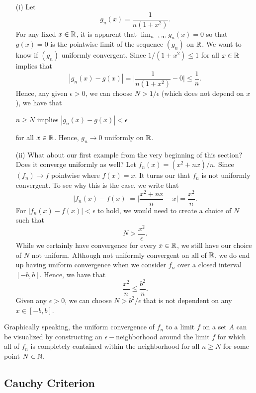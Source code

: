 \begin{enumerate}
    \item[(i)] Let 
        \[  g_n(x) = \frac{ 1 }{ n(1 + x^2 ) }.  \]
        For any fixed \( x \in \mathbb{R}  \), it is apparent that \( \lim_{ n \to \infty  } g_n(x) = 0  \) so that \( g(x) = 0   \) is the pointwise limit of the sequence \( (g_n)  \) on \( \mathbb{R}  \). We want to know if \( (g_n)  \) uniformly convergent. Since \( 1 / (1 + x^2 )  \leq 1  \) for all \( x \in \mathbb{R}  \) implies that 
        \[  | g_n(x) - g(x)  | = \Big| \frac{ 1 }{ n(1+x^2 )  } - 0  \Big| \leq \frac{ 1 }{ n }.  \]
Hence, any given \( \epsilon > 0  \), we can choose \( N > 1 / \epsilon  \) (which does not depend on \( x  \)), we have that
\begin{center}
    \( n \geq N  \) implies \( | g_n(x) - g(x)  | < \epsilon  \)
\end{center}
for all \( x \in \mathbb{R}  \). Hence, \( g_n \to 0 \) uniformly on \( \mathbb{R}  \).
\item[(ii)] What about our first example from the very beginning of this section? Does it converge uniformly as well?  Let \( f_n(x) = (x^2 + n x ) / n  \). Since \( (f_n) \to f  \) pointwise where \( f(x) =x  \). It turns our that \( f_n  \) is not uniformly convergent. To see why this is the case, we write that
    \[  | f_n(x) - f(x)  | = \Big| \frac{ x^2 + nx  }{ n  } - x  \Big| = \frac{ x^2  }{ n }. \]
    For \( | f_n(x) - f(x)  | < \epsilon  \) to hold, we would need to create a choice of \( N  \) such that 
    \[  N  > \frac{ x^2  }{ \epsilon  }. \]
    While we certainly have convergence for every \( x \in \mathbb{R}  \), we still have our choice of \( N  \) not uniform. Although not uniformly convergent on all of \( \mathbb{R}  \), we do end up having uniform convergence when we consider \( f_n  \) over a closed interval \( [-b,b] \). Hence, we have that 
    \[  \frac{ x^2  }{ n }  \leq \frac{ b^2  }{ n  }. \]
    Given any \( \epsilon > 0  \), we can choose \( N > b^2 / \epsilon  \) that is not dependent on any \( x \in [-b,b]  \).
\end{enumerate}

Graphically speaking, the uniform convergence of \( f_n  \) to a limit \( f  \) on a set \( A  \) can be visualized by constructing an \( \epsilon -  \)neighborhood around the limit \( f  \) for which all of \( f_n  \) is completely contained within the neighborhood for all \(  n \geq N  \) for some point \( N \in \mathbb{N}  \).

\subsection{Cauchy Criterion}

